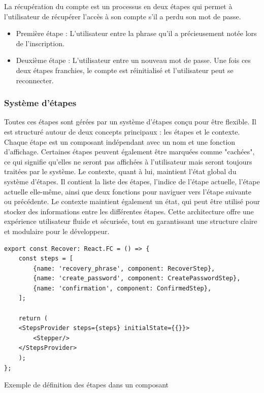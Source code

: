La récupération du compte est un processus en deux étapes qui permet à l'utilisateur de récupérer l'accès à son compte s'il a perdu son mot de passe.

\begin{itemize}
    \item Première étape : L'utilisateur entre la phrase qu'il a précieusement notée lors de l'inscription.
    \item Deuxième étape : L'utilisateur entre un nouveau mot de passe. Une fois ces deux étapes franchies, le compte est réinitialisé et l'utilisateur peut se reconnecter.
\end{itemize}

\subsubsection{Système d'étapes}
Toutes ces étapes sont gérées par un système d'étapes conçu pour être flexible. Il est structuré autour de deux concepts principaux : les étapes et le contexte. Chaque étape est un composant indépendant avec un nom et une fonction d'affichage. Certaines étapes peuvent également être marquées comme "cachées", ce qui signifie qu'elles ne seront pas affichées à l'utilisateur mais seront toujours traitées par le système. Le contexte, quant à lui, maintient l'état global du système d'étapes. Il contient la liste des étapes, l'indice de l'étape actuelle, l'étape actuelle elle-même, ainsi que deux fonctions pour naviguer vers l'étape suivante ou précédente. Le contexte maintient également un état, qui peut être utilisé pour stocker des informations entre les différentes étapes. Cette architecture offre une expérience utilisateur fluide et sécurisée, tout en garantissant une structure claire et modulaire pour le développeur.

\begin{listing}[H]
    \begin{verbatim}
export const Recover: React.FC = () => {
    const steps = [
        {name: 'recovery_phrase', component: RecoverStep},
        {name: 'create_password', component: CreatePasswordStep},
        {name: 'confirmation', component: ConfirmedStep},
    ];

    return (
    <StepsProvider steps={steps} initialState={{}}>
        <Stepper/>
    </StepsProvider>
    );
};
  \end{verbatim}
    \caption{Exemple de définition des étapes dans un composant}
\end{listing}


